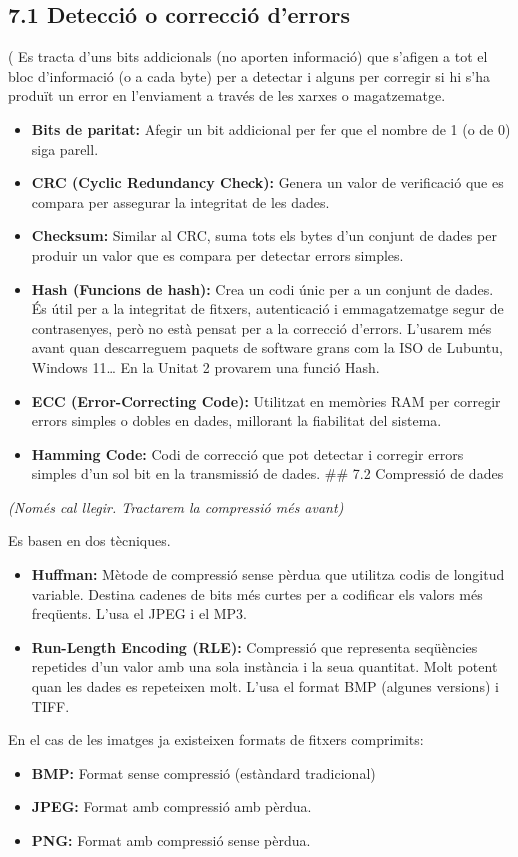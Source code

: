 \documentclass[
  12 pt,
  a4paper,
]{article}
\providecommand{\tightlist}{%
  \setlength{\itemsep}{0pt}\setlength{\parskip}{0pt}}
\begin{document}
\subsection{7.1 Detecció o correcció
d'errors}\label{detecciuxf3-o-correcciuxf3-derrors}

( Es tracta d'uns bits addicionals (no aporten informació) que s'afigen
a tot el bloc d'informació (o a cada byte) per a detectar i alguns per
corregir si hi s'ha produït un error en l'enviament a través de les
xarxes o magatzematge.

\begin{itemize}
\item
  \textbf{Bits de paritat:} Afegir un bit addicional per fer que el
  nombre de 1 (o de 0) siga parell.
\item
  \textbf{CRC (Cyclic Redundancy Check):} Genera un valor de verificació
  que es compara per assegurar la integritat de les dades.
\item
  \textbf{Checksum:} Similar al CRC, suma tots els bytes d'un conjunt de
  dades per produir un valor que es compara per detectar errors simples.
\item
  \textbf{Hash (Funcions de hash):} Crea un codi únic per a un conjunt
  de dades. És útil per a la integritat de fitxers, autenticació i
  emmagatzematge segur de contrasenyes, però no està pensat per a la
  correcció d'errors. L'usarem més avant quan descarreguem paquets de
  software grans com la ISO de Lubuntu, Windows 11\ldots{} En la Unitat
  2 provarem una funció Hash.
\item
  \textbf{ECC (Error-Correcting Code):} Utilitzat en memòries RAM per
  corregir errors simples o dobles en dades, millorant la fiabilitat del
  sistema.
\item
  \textbf{Hamming Code:} Codi de correcció que pot detectar i corregir
  errors simples d'un sol bit en la transmissió de dades. \#\# 7.2
  Compressió de dades
\end{itemize}

\emph{(Només cal llegir. Tractarem la compressió més avant)}

Es basen en dos tècniques.

\begin{itemize}
\item
  \textbf{Huffman:} Mètode de compressió sense pèrdua que utilitza codis
  de longitud variable. Destina cadenes de bits més curtes per a
  codificar els valors més freqüents. L'usa el JPEG i el MP3.
\item
  \textbf{Run-Length Encoding (RLE):} Compressió que representa
  seqüències repetides d'un valor amb una sola instància i la seua
  quantitat. Molt potent quan les dades es repeteixen molt. L'usa el
  format BMP (algunes versions) i TIFF.
\end{itemize}

En el cas de les imatges ja existeixen formats de fitxers comprimits:

\begin{itemize}
\tightlist
\item
  \textbf{BMP:} Format sense compressió (estàndard tradicional)
\item
  \textbf{JPEG:} Format amb compressió amb pèrdua.
\item
  \textbf{PNG:} Format amb compressió sense pèrdua.
\end{itemize}
\end{document}
